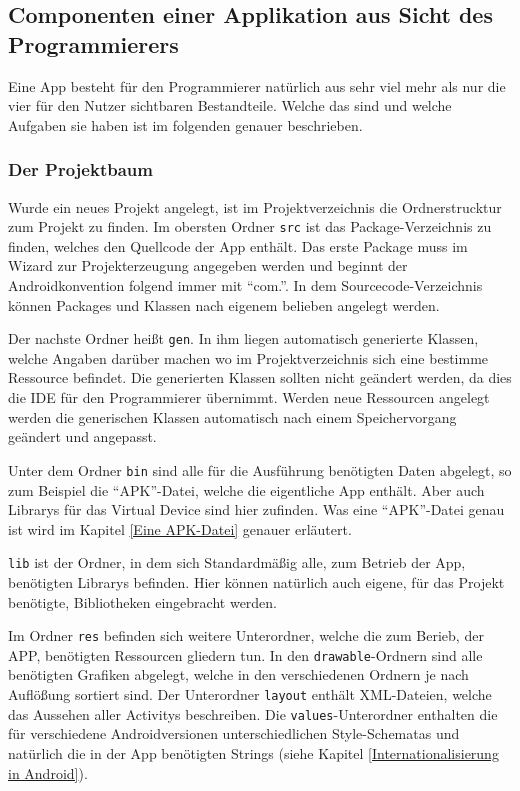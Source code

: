 \subsection{Componenten einer Applikation aus Sicht des Programmierers} \label{Componenten einer Applikation aus Sicht des Programmierers}
Eine App besteht f\"ur den Programmierer nat\"urlich aus sehr viel mehr als nur die vier f\"ur den Nutzer sichtbaren Bestandteile. Welche das sind und welche Aufgaben sie haben ist im folgenden genauer beschrieben. \cite{GolemHBAppAusEntwicklerSicht}

\subsubsection{Der Projektbaum}
Wurde ein neues Projekt angelegt, ist im Projektverzeichnis die Ordnerstrucktur zum Projekt zu finden. Im obersten Ordner \texttt{src} ist das Package-Verzeichnis zu finden, welches den Quellcode der App enth\"alt. Das erste Package muss im Wizard zur Projekterzeugung angegeben werden und beginnt der Androidkonvention folgend immer mit "`com."'. In dem Sourcecode-Verzeichnis k\"onnen Packages und Klassen nach eigenem belieben angelegt werden.

Der nachste Ordner hei\ss{}t \texttt{gen}. In ihm liegen automatisch generierte Klassen, welche Angaben dar\"uber machen wo im Projektverzeichnis sich eine bestimme Ressource befindet.
Die generierten Klassen sollten nicht ge\"andert werden, da dies die \ac{IDE} f\"ur den Programmierer \"ubernimmt. Werden neue Ressourcen angelegt werden die generischen Klassen automatisch nach einem Speichervorgang ge\"andert und angepasst.

Unter dem Ordner \texttt{bin} sind alle f\"ur die Ausf\"uhrung ben\"otigten Daten abgelegt, so zum Beispiel die "`APK"'-Datei, welche die eigentliche App enth\"alt. Aber auch Librarys f\"ur das Virtual Device sind hier zufinden. Was eine "`APK"'-Datei genau ist wird im Kapitel \ref{Eine APK-Datei} genauer erl\"autert.

\texttt{lib} ist der Ordner, in dem sich Standardm\"a\ss{}ig alle, zum Betrieb der App, ben\"otigten Librarys befinden. Hier k\"onnen nat\"urlich auch eigene, f\"ur das Projekt ben\"otigte, Bibliotheken eingebracht werden.

Im Ordner \texttt{res} befinden sich weitere Unterordner, welche die zum Berieb, der APP, ben\"otigten Ressourcen gliedern tun. In den \texttt{drawable}-Ordnern sind alle ben\"otigten Grafiken abgelegt, welche in den verschiedenen Ordnern je nach Aufl\"o\ss{}ung sortiert sind. Der Unterordner \texttt{layout} enth\"alt XML-Dateien, welche das Aussehen aller Activitys beschreiben. Die \texttt{values}-Unterordner enthalten die f\"ur verschiedene Androidversionen unterschiedlichen Style-Schematas und nat\"urlich die in der App ben\"otigten Strings (siehe Kapitel \ref{Internationalisierung in Android}).


